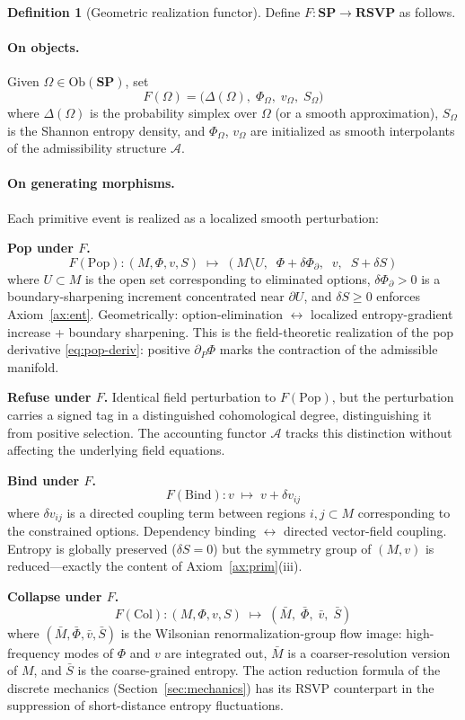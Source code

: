 \documentclass[12pt, a4paper]{article}
\theoremstyle{definition}
\newtheorem{definition}[theorem]{Definition}
\theoremstyle{remark}
\newcommand{\SP}{\mathbf{SP}}
\newcommand{\RSVP}{\mathbf{RSVP}}
\newcommand{\Pop}{\mathrm{Pop}}
\newcommand{\Bind}{\mathrm{Bind}}
\newcommand{\Collapse}{\mathrm{Col}}
\newcommand{\Ob}{\mathrm{Ob}}
\begin{document}
\begin{definition}[Geometric realization functor]
Define $F : \SP \to \RSVP$ as follows.

\paragraph{On objects.}
Given $\Omega \in \Ob(\SP)$, set
\[
  F(\Omega) = \bigl(\Delta(\Omega),\; \Phi_\Omega,\; v_\Omega,\; S_\Omega\bigr)
\]
where $\Delta(\Omega)$ is the probability simplex over $\Omega$ (or a smooth
approximation), $S_\Omega$ is the Shannon entropy density, and $\Phi_\Omega$,
$v_\Omega$ are initialized as smooth interpolants of the admissibility structure
$\mathcal{A}$.

\paragraph{On generating morphisms.}
Each primitive event is realized as a localized smooth perturbation:

\medskip
\noindent
\textbf{Pop under $F$.}
\[
  F(\Pop) : (M, \Phi, v, S) \;\longmapsto\;
  (M \setminus U,\;\; \Phi + \delta\Phi_\partial,\;\; v,\;\; S + \delta S)
\]
where $U \subset M$ is the open set corresponding to eliminated options,
$\delta\Phi_\partial > 0$ is a boundary-sharpening increment concentrated near
$\partial U$, and $\delta S \ge 0$ enforces Axiom~\ref{ax:ent}. Geometrically:
option-elimination $\leftrightarrow$ localized entropy-gradient increase + boundary
sharpening. This is the field-theoretic realization of the pop derivative
\eqref{eq:pop-deriv}: positive $\partial_P\Phi$ marks the contraction of the
admissible manifold.

\medskip
\noindent
\textbf{Refuse under $F$.}
Identical field perturbation to $F(\Pop)$, but the perturbation carries a signed tag
in a distinguished cohomological degree, distinguishing it from positive selection.
The accounting functor $\mathcal{A}$ tracks this distinction without affecting the
underlying field equations.

\medskip
\noindent
\textbf{Bind under $F$.}
\[
  F(\Bind) : v \;\longmapsto\; v + \delta v_{ij}
\]
where $\delta v_{ij}$ is a directed coupling term between regions $i, j \subset M$
corresponding to the constrained options. Dependency binding
$\leftrightarrow$ directed vector-field coupling. Entropy is globally preserved
($\delta S = 0$) but the symmetry group of $(M, v)$ is reduced—exactly the
content of Axiom~\ref{ax:prim}(iii).

\medskip
\noindent
\textbf{Collapse under $F$.}
\[
  F(\Collapse) : (M, \Phi, v, S) \;\longmapsto\;
  (\bar M,\; \bar\Phi,\; \bar v,\; \bar S)
\]
where $(\bar M, \bar\Phi, \bar v, \bar S)$ is the Wilsonian renormalization-group
flow image: high-frequency modes of $\Phi$ and $v$ are integrated out, $\bar M$ is a
coarser-resolution version of $M$, and $\bar S$ is the coarse-grained entropy. The
action reduction formula of the discrete mechanics (Section~\ref{sec:mechanics}) has
its RSVP counterpart in the suppression of short-distance entropy fluctuations.
\end{definition}
\end{document}
